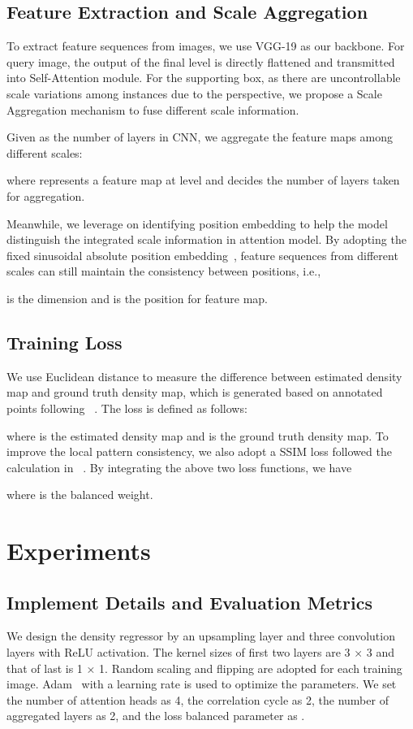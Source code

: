 \documentclass{article}
\newcommand\XP[1]{\textcolor{black}{#1}}\newcommand\XPC[1]{\textcolor{black}{[#1]}}
\begin{document}
\subsection{Feature Extraction and Scale Aggregation}

To extract feature sequences from images, we use VGG-19 as our backbone. For query image, the output of the final level is directly flattened and transmitted into Self-Attention module. For the supporting box, as there are uncontrollable scale variations among instances due to the perspective, we propose a Scale Aggregation mechanism to fuse different scale information.

Given  as the number of layers in CNN, we aggregate the feature maps among different scales:

where  represents a feature map at  level and  decides the number of layers taken for aggregation.

Meanwhile, we leverage on identifying position embedding to help the model distinguish the integrated scale information in attention model. By adopting the fixed sinusoidal absolute position embedding~\cite{vaswani2017attention}, feature sequences from different scales can still maintain the consistency between positions, i.e., 

 is the dimension and  is the position for  feature map.


\subsection{Training Loss}

We use Euclidean distance to measure the difference between estimated density map and ground truth density map, which is generated based on annotated points following ~\cite{zhang2016single}. The loss is defined as follows:

where  is the estimated density map and  is the ground truth density map. To improve the local pattern consistency, we also adopt a SSIM loss followed the calculation in ~\cite{cao2018scale}. By integrating the above two loss functions, we have

where  is the balanced weight.

\section{Experiments}


\subsection{Implement Details and Evaluation Metrics}
We design the density regressor by an upsampling layer and three convolution layers with ReLU activation. The kernel sizes of first two layers are 3 × 3 and that of last is 1 × 1. Random scaling and flipping are adopt\XP{ed} for each training image. Adam~\cite{kingmaadam} with a learning rate  is used to optimize the parameters. We set the number of attention heads  as 4, the correlation cycle  as 2, the number of aggregated layers  as 2, and the loss balanced parameter  as .
\end{document}
